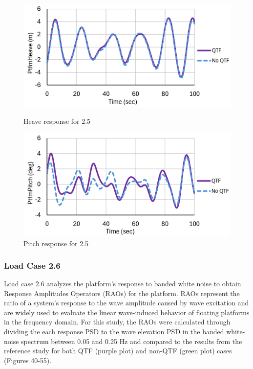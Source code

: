 \documentclass[a4paper, 11pt]{article}
\begin{document}
\begin{figure}[H]
    \begin{minipage}{0.49\textwidth}
        \centering
        \includegraphics[width=1\textwidth]{2.5_heave.png}
        \caption{\small Heave response for 2.5}
        \label{fig:2.5_heave}
    \end{minipage}
    \hfill
    \begin{minipage}{0.49\textwidth}
        \centering
        \vspace{-0.3cm}
        \includegraphics[width=1\textwidth]{2.5_pitch.png}
        \caption{\small Pitch response for 2.5}
        \label{fig:2.5_pitch}
    \end{minipage}
\end{figure}

\subsubsection{Load Case 2.6}
\hspace*{0.5cm}Load case 2.6 analyzes the platform's response to banded white noise to obtain Response Amplitudes Operators (RAOs) for the platform. RAOs represent the ratio of a system's response to the wave amplitude caused by wave excitation and are widely used to evaluate the linear wave-induced behavior of floating platforms in the frequency domain. For this study, the RAOs were calculated through dividing the each response PSD to the wave elevation PSD in the banded white-noise spectrum between 0.05 and 0.25 Hz and compared to the results from the reference study for both QTF (purple plot) and non-QTF (green plot) cases (Figures 40-55).
\end{document}
